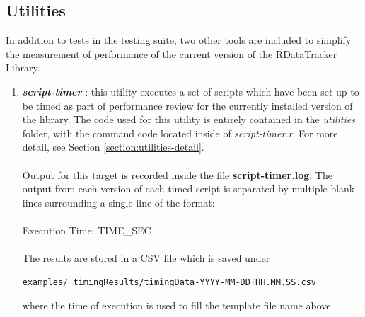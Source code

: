 \documentclass[12pt]{article}
\begin{document}
\subsection{Utilities}
\label{sec:utilities}
In addition to tests in the testing suite, two other tools are included to simplify the measurement of performance of the current version of the RDataTracker Library. 
\begin{enumerate}
\item \textbf{\textit{script-timer}} : this utility executes a set of scripts which have been set up to be timed as part of performance review for the currently installed version of the library.  The code used for this utility is entirely contained in the \textit{utilities} folder, with the command code located inside of \textit{script-timer.r}. For more detail, see Section \ref{section:utilities-detail}.\\\\
Output for this target is recorded inside the file \textbf{script-timer.log}. The output from each version of each timed script is separated by multiple blank lines surrounding a single line of the format: \\\\
Execution Time: TIME\_SEC \\\\
The results are stored in a CSV file which is saved under
\begin{lstlisting}
examples/_timingResults/timingData-YYYY-MM-DDTHH.MM.SS.csv
\end{lstlisting}
where the time of execution is used to fill the template file name above.
 

\end{enumerate}
\end{document}
